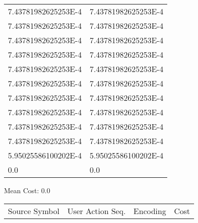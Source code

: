 \documentclass[12pt]{article}
\begin{document}
\begin{tabular}{l l}
7.43781982625253E-4	&	7.43781982625253E-4\\
7.43781982625253E-4	&	7.43781982625253E-4\\
7.43781982625253E-4	&	7.43781982625253E-4\\
7.43781982625253E-4	&	7.43781982625253E-4\\
7.43781982625253E-4	&	7.43781982625253E-4\\
7.43781982625253E-4	&	7.43781982625253E-4\\
7.43781982625253E-4	&	7.43781982625253E-4\\
7.43781982625253E-4	&	7.43781982625253E-4\\
7.43781982625253E-4	&	7.43781982625253E-4\\
7.43781982625253E-4	&	7.43781982625253E-4\\
5.95025586100202E-4	&	5.95025586100202E-4\\
0.0	&	0.0\\
\end{tabular}\newpage
\noindent
\noindent Mean Cost: 0.0\\
\begin{tabular}{l l l l}
Source Symbol	&	User Action Seq.	&	Encoding	&	Cost\\
\end{tabular}
\end{document}
